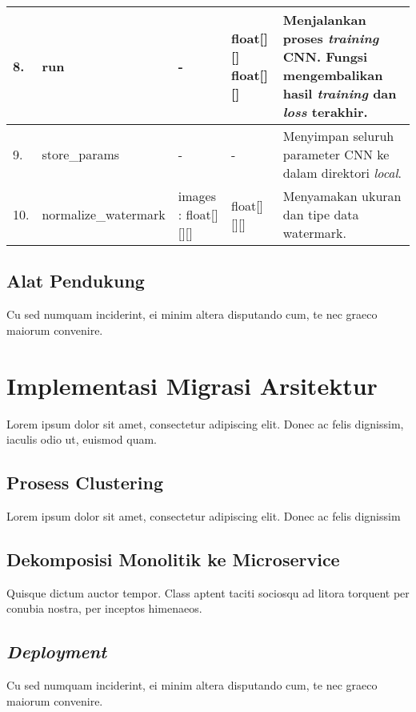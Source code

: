 \begin{small}
\begin{longtable}[c]{|p{0.4cm}|p{3cm}|p{2.8cm}|p{1.8cm}|p{3.8cm}|}
		8. & run & - & float[][] \newline float[][] & Menjalankan proses \textit{training} CNN. Fungsi mengembalikan hasil \textit{training} dan \textit{loss} terakhir. \\ \hline
		9. & store\_params & - & - & Menyimpan seluruh parameter CNN ke dalam direktori \textit{local}. \\ \hline
		10. & normalize\newline \_watermark & images : float[][][] & float[][][] & Menyamakan ukuran dan tipe data watermark. \\ \hline
		
	\end{longtable}
\end{small}


\subsection{Alat Pendukung}
Cu sed numquam inciderint, ei minim altera disputando cum, te nec graeco maiorum convenire.\\

\section{Implementasi Migrasi Arsitektur}
Lorem ipsum dolor sit amet, consectetur adipiscing elit. Donec ac felis dignissim, iaculis odio ut, euismod quam. \\

\subsection{Prosess Clustering}
Lorem ipsum dolor sit amet, consectetur adipiscing elit. Donec ac felis dignissim\\

\subsection{Dekomposisi Monolitik ke Microservice}
Quisque dictum auctor tempor. Class aptent taciti sociosqu ad litora torquent per conubia nostra, per inceptos himenaeos.\\

\subsection{\textit{Deployment}}
Cu sed numquam inciderint, ei minim altera disputando cum, te nec graeco maiorum convenire.\\

